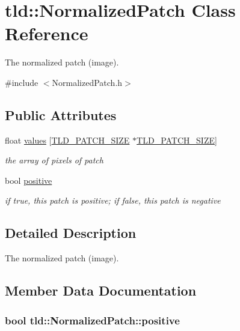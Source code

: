 \hypertarget{classtld_1_1NormalizedPatch}{\section{tld\-:\-:Normalized\-Patch Class Reference}
\label{classtld_1_1NormalizedPatch}
}


The normalized patch (image).  




{\ttfamily \#include $<$Normalized\-Patch.\-h$>$}

\subsection*{Public Attributes}
\begin{DoxyCompactItemize}
\item 
float \hyperlink{classtld_1_1NormalizedPatch_ae76afafa7dd50901d7c468b92d1c1df5}{values} \mbox{[}\hyperlink{NormalizedPatch_8h_af7b481162876c5821cbfe7cb11f3a7d0}{T\-L\-D\-\_\-\-P\-A\-T\-C\-H\-\_\-\-S\-I\-Z\-E} $\ast$\hyperlink{NormalizedPatch_8h_af7b481162876c5821cbfe7cb11f3a7d0}{T\-L\-D\-\_\-\-P\-A\-T\-C\-H\-\_\-\-S\-I\-Z\-E}\mbox{]}
\begin{DoxyCompactList}\small\item\em the array of pixels of patch \end{DoxyCompactList}\item 
bool \hyperlink{classtld_1_1NormalizedPatch_a0d064e4aea00c363f5b0eb768cf743ea}{positive}
\begin{DoxyCompactList}\small\item\em if true, this patch is positive; if false, this patch is negative \end{DoxyCompactList}\end{DoxyCompactItemize}


\subsection{Detailed Description}
The normalized patch (image). 

\subsection{Member Data Documentation}
\hypertarget{classtld_1_1NormalizedPatch_a0d064e4aea00c363f5b0eb768cf743ea}{
\subsubsection[{positive}]{\setlength{\rightskip}{0pt plus 5cm}bool tld\-::\-Normalized\-Patch\-::positive}}\label{classtld_1_1NormalizedPatch_a0d064e4aea00c363f5b0eb768cf743ea}


